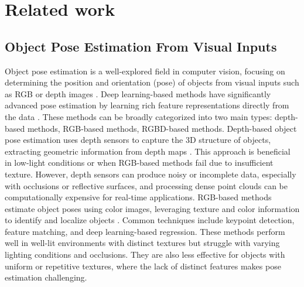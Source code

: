 \section{Related work}
\label{sec:relatedwork}

\subsection{Object Pose Estimation From Visual Inputs}

Object pose estimation is a well-explored field in computer vision, focusing on determining the position and orientation (pose) of objects from visual inputs such as RGB or depth images \cite{wang2019densefusion, he2020pvn3d, he2021ffb6d}. Deep learning-based methods have significantly advanced pose estimation by learning rich feature representations directly from the data \cite{wang2021gdr, peng2019pvnet}. These methods can be broadly categorized into two main types: depth-based methods, RGB-based methods, RGBD-based methods. Depth-based object pose estimation uses depth sensors to capture the 3D structure of objects, extracting geometric information from depth maps \cite{wang20216d, gao20206d, guo2021efficient}. This approach is beneficial in low-light conditions or when RGB-based methods fail due to insufficient texture. However, depth sensors can produce noisy or incomplete data, especially with occlusions or reflective surfaces, and processing dense point clouds can be computationally expensive for real-time applications. RGB-based methods estimate object poses using color images, leveraging texture and color information to identify and localize objects \cite{billings2019silhonet, peng2019pvnet, wang2021gdr}. Common techniques include keypoint detection, feature matching, and deep learning-based regression. These methods perform well in well-lit environments with distinct textures but struggle with varying lighting conditions and occlusions. They are also less effective for objects with uniform or repetitive textures, where the lack of distinct features makes pose estimation challenging. 

